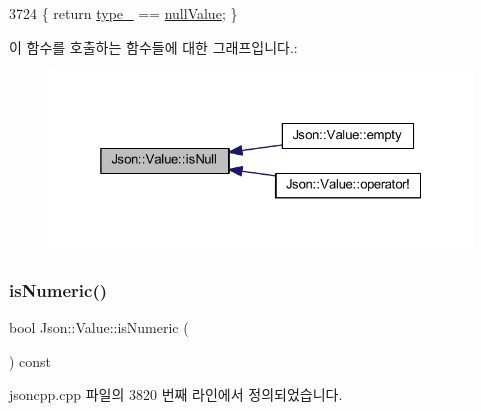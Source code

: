 \begin{DoxyCode}
3724 \{ \textcolor{keywordflow}{return} \hyperlink{class_json_1_1_value_abd222c2536dc88bf330dedcd076d2356}{type\_} == \hyperlink{namespace_json_a7d654b75c16a57007925868e38212b4ea7d9899633b4409bd3fc107e6737f8391}{nullValue}; \}
\end{DoxyCode}
이 함수를 호출하는 함수들에 대한 그래프입니다.\+:\nopagebreak
\begin{figure}[H]
\begin{center}
\leavevmode
\includegraphics[width=325pt]{class_json_1_1_value_abde4070e21e46dc4f8203f66582cb19f_icgraph}
\end{center}
\end{figure}
\mbox{\label{class_json_1_1_value_af961a000cd203c895e44c195ab39b866}} 
\subsubsection{\texorpdfstring{is\+Numeric()}{isNumeric()}}
{\footnotesize\ttfamily bool Json\+::\+Value\+::is\+Numeric (\begin{DoxyParamCaption}{ }\end{DoxyParamCaption}) const}



jsoncpp.\+cpp 파일의 3820 번째 라인에서 정의되었습니다.


